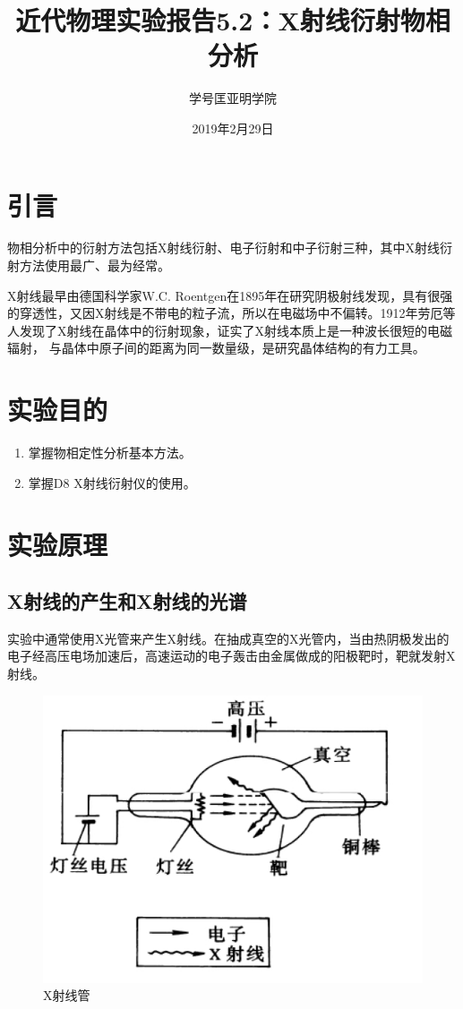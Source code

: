 \documentclass[a4paper]{article}
\title{近代物理实验报告5.2：X射线衍射物相分析}
\author{\quad 学号\quad 匡亚明学院}
\date{2019年2月29日}
\begin{document}
\maketitle


\section{引言}
物相分析中的衍射方法包括X射线衍射、电子衍射和中子衍射三种，其中X射线衍射方法使用最广、最为经常。

X射线最早由德国科学家W.C. Roentgen在1895年在研究阴极射线发现，具有很强的穿透性，又因X射线是不带电的粒子流，所以在电磁场中不偏转。1912年劳厄等人发现了X射线在晶体中的衍射现象，证实了X射线本质上是一种波长很短的电磁辐射，
与晶体中原子间的距离为同一数量级，是研究晶体结构的有力工具。
\section{实验目的}
\begin{enumerate}
\item 掌握物相定性分析基本方法。
\item 掌握D8 X射线衍射仪的使用。
\end{enumerate}


\section{实验原理}

\subsection{X射线的产生和X射线的光谱}
实验中通常使用X光管来产生X射线。在抽成真空的X光管内，当由热阴极发出的电子经高压电场加速后，高速运动的电子轰击由金属做成的阳极靶时，靶就发射X射线。
\begin{figure}[H]
	\centering
	\includegraphics[width=0.5\linewidth]{fig/X1.jpg}
	\caption{X射线管}
\end{figure}
\end{document}
